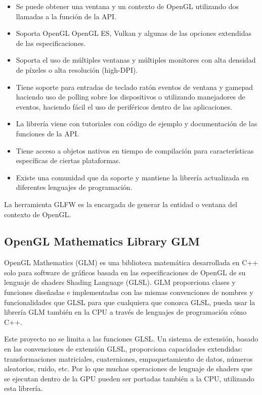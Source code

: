 \documentclass[a4paper, 17pt]{book}
\begin{document}
\begin{itemize}
  \item Se puede obtener una ventana y un contexto de OpenGL utilizando dos llamadas a la
  función de la API.

  \item Soporta OpenGL OpenGL ES, Vulkan y algunas de las opciones extendidas de las
  especificaciones.

  \item Soporta el uso de múltiples ventanas y múltiples monitores con alta densidad de
  píxeles o alta resolución (high-DPI).

  \item Tiene soporte para entradas de teclado ratón eventos de ventana y gamepad haciendo
  uso de polling sobre los dispositivos o utilizando manejadores de eventos, haciendo fácil
  el uso de periféricos dentro de las aplicaciones.

  \item La librería viene con tutoriales con código de ejemplo y documentación de las
  funciones de la API.

  \item Tiene acceso a objetos nativos en tiempo de compilación para características específicas
  de ciertas plataformas.

  \item Existe una comunidad que da soporte y mantiene la librería actualizada en diferentes
  lenguajes de programación.

\end{itemize}

La herramienta GLFW es la encargada de generar la entidad o ventana del contexto de OpenGL.

\subsection{OpenGL Mathematics Library GLM} 
\label{subsec:GLM}

OpenGL Mathematics (GLM) es una biblioteca matemática desarrollada en C++ solo para software
de gráficos basada en las especificaciones de OpenGL de su lenguaje de shaders Shading Language (GLSL).
GLM proporciona clases y funciones diseñadas e implementadas con las mismas convenciones de nombres
y funcionalidades que GLSL para que cualquiera que conozca GLSL, pueda usar la librería GLM también
en la CPU a través de lenguajes de programación cómo C++.

Este proyecto no se limita a las funciones GLSL. Un sistema de extensión, basado en las convenciones
de extensión GLSL, proporciona capacidades extendidas: transformaciones matriciales, cuaterniones,
empaquetamiento de datos, números aleatorios, ruido, etc. Por lo que muchas operaciones de lenguaje
de shaders que se ejecutan dentro de la GPU pueden ser portadas también a la CPU, utilizando esta librería.
\end{document}
